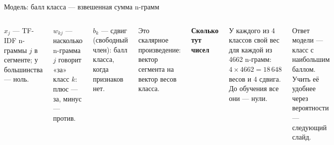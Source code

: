 \documentclass[aspectratio=169,12pt]{beamer}
\newcommand{\пр}{\kern0.04em\vrule height0.45ex depth0pt width0.06em%
  \vrule height0.06em depth0pt width0.42em\vrule height0.45ex depth0pt width0.06em\kern0.04em}
\newcommand{\формула}[1]{\par\vspace{0.25em}{\centering$\displaystyle #1$\par}\vspace{0.25em}}
\newcommand{\блок}[3]{%
  \vspace{1.4cm}
  {\color{brick}\small\bfseries БЛОК #1\par}
  \vspace{0.6cm}
  {\color{navy}\fontsize{28}{32}\selectfont\bfseries #2\par}
  \vspace{0.6cm}
  {\color{ink}\large #3\par}}
\begin{document}
\begin{frame}{Модель: балл класса — взвешенная сумма n-грамм}
\color{ink}
  \begin{columns}[T,onlytextwidth]
      {\small
      \формула{z_k = \sum_{j=1}^{4662} w_{kj}\,x_j + b_k}
      $x_j$ — TF-IDF n-граммы $j$ в сегменте; у большинства — ноль.\par
      $w_{kj}$ — насколько n-грамма $j$ говорит «за» класс $k$: плюс — за,
      минус — против.\par
      $b_k$ — сдвиг (свободный член): балл класса, когда признаков нет.\par
      \vspace{0.3em}
      Это скалярное произведение: вектор сегмента на вектор весов
      класса.}
      {\color{navy}\bfseries Сколько тут чисел}\\[0.2em]
      {\small У каждого из 4 классов свой вес для каждой из 4662 n-грамм:
      $4 \times 4662 = 18\,648$ весов и 4 сдвига. До обучения все они —
      нули.\par
      \vspace{0.5em}
      Ответ модели — класс с наибольшим баллом. Учить её удобнее через
      вероятности — следующий слайд.}
  \end{columns}

\end{frame}
\end{document}
